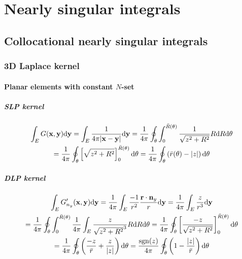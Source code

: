 \chapter{Nearly singular integrals}
\label{sec:nearly_singular}

\section{Collocational nearly singular integrals}

\subsection{3D Laplace kernel}

\subsubsection{Planar elements with constant $N$-set}

\paragraph{SLP kernel}

\begin{multline}
	\int_E G({\bf x}, {\bf y}) \mathrm{d} {\bf y}
	= \int_E \frac{1}{4\pi |{\bf x} - {\bf y}|} \mathrm{d} {\bf y}
	= \frac{1}{4\pi} \oint_{\theta} \int_{0}^{\bar{R}(\theta)} \frac{1}{\sqrt{z^2 + R^2}} R \mathrm{d} R \mathrm{d} \theta
	\\
	= \frac{1}{4\pi} \oint_{\theta} \left[ \sqrt{z^2 + R^2} \right]_{0}^{\bar{R}(\theta)} \mathrm{d} \theta
	= \frac{1}{4\pi} \oint_{\theta} \left( \bar{r}(\theta) - |z| \right) \mathrm{d} \theta
\end{multline}

\paragraph{DLP kernel}

\begin{multline}
	\int_E G'_{n_y}({\bf x}, {\bf y}) \mathrm{d} {\bf y}
	= \frac{1}{4\pi} \int_E \frac{-1}{r^2} \frac{{\bf r} \cdot {\bf n}_y}{r} \mathrm{d} {\bf y}
	= \frac{1}{4\pi} \int_E \frac{z}{r^3} \mathrm{d} {\bf y}
	\\
	= \frac{1}{4\pi} \oint_{\theta} \int_{0}^{\bar{R}(\theta)} \frac{1}{4\pi} \int_E \frac{z}{\sqrt{z^2 + R^2}^3} R \mathrm{d} R \mathrm{d} \theta
	= \frac{1}{4\pi} \oint_{\theta} \left[ \frac{-z}{\sqrt{z^2 + R^2}} \right]_{0}^{\bar{R}(\theta)} \mathrm{d} \theta \\
	= \frac{1}{4\pi} \oint_{\theta} \left( \frac{-z}{\bar{r}} + \frac{z}{|z|} \right) \mathrm{d} \theta
	= \frac{\operatorname{sgn}(z)}{4\pi} \oint_{\theta} \left( 1 - \frac{|z|}{\bar{r}} \right) \mathrm{d} \theta
\end{multline}

